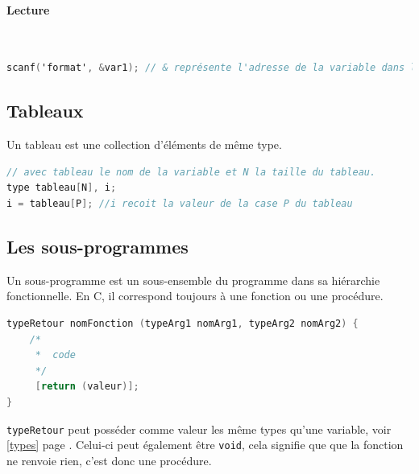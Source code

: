 \documentclass[12pt,a4paper,openany]{book}
\begin{document}
\paragraph{Lecture}~\newline
\begin{lstlisting}[language=C, caption=Syntaxe de l'appel de scanf]
scanf('format', &var1); // & représente l'adresse de la variable dans laquelle écrire.
\end{lstlisting}

\subsection{Tableaux}
Un tableau est une collection d'éléments de même type.
\begin{lstlisting}[language=C, caption=Syntaxe de déclaration d'un tableau]
// avec tableau le nom de la variable et N la taille du tableau. 
type tableau[N], i; 
i = tableau[P]; //i recoit la valeur de la case P du tableau
\end{lstlisting}
\subsection{Les sous-programmes}
Un sous-programme est un sous-ensemble du programme dans sa hiérarchie fonctionnelle. En C, il correspond toujours à une fonction ou une procédure.
\begin{lstlisting}[language=C, caption=Syntaxe d'un sous programme]
typeRetour nomFonction (typeArg1 nomArg1, typeArg2 nomArg2) {
	/*
     *	code
	 */
	 [return (valeur)];
}
\end{lstlisting}
\texttt{typeRetour} peut posséder comme valeur les même types qu'une variable, voir \ref{types} page \pageref{types}. Celui-ci peut également être \texttt{void}, 
cela signifie que que la fonction ne renvoie rien, c'est donc une procédure.
\end{document}
